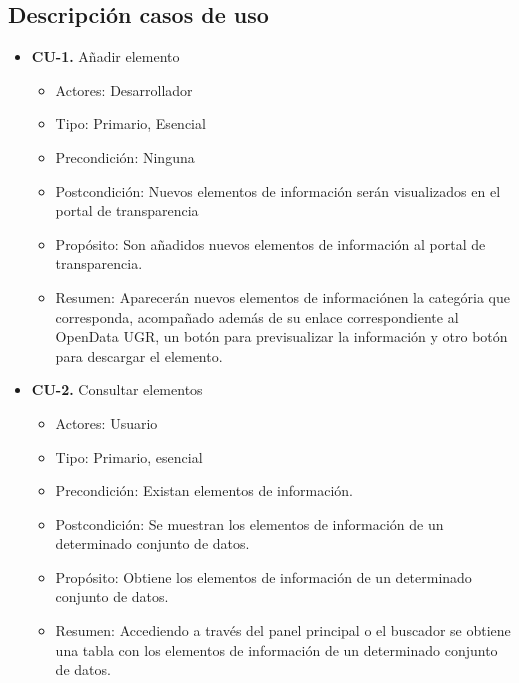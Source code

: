 \subsection{Descripción casos de uso}

\begin{itemize}
 \item \textbf{CU-1.} Añadir elemento
 \begin{itemize}
  \item Actores: Desarrollador
  \item Tipo: Primario, Esencial
  \item Precondición: Ninguna
  \item Postcondición: Nuevos elementos de información serán visualizados en el portal de transparencia
  \item Propósito: Son añadidos nuevos elementos de información al portal de transparencia.
  \item Resumen: Aparecerán nuevos elementos de informaciónen la categória que corresponda, acompañado además de su enlace
  correspondiente al OpenData UGR, un botón para previsualizar la información y otro botón para descargar el elemento.
 \end{itemize}
\end{itemize}

\newpage
\begin{itemize}
 \item \textbf{CU-2.} Consultar elementos
 \begin{itemize}
  \item Actores: Usuario
  \item Tipo: Primario, esencial
  \item Precondición: Existan elementos de información.
  \item Postcondición: Se muestran los elementos de información de un determinado conjunto de datos.
  \item Propósito: Obtiene los elementos de información de un determinado conjunto de datos.
  \item Resumen: Accediendo a través del panel principal o el buscador se obtiene una tabla con los elementos de información
  de un determinado conjunto de datos.
 \end{itemize}
\end{itemize}

